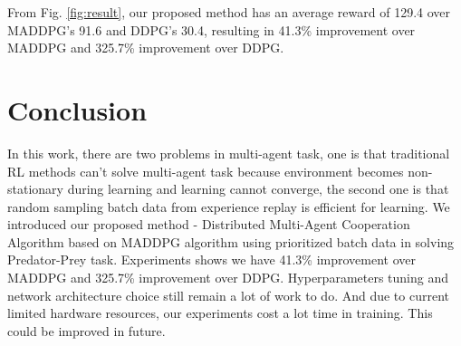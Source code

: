 \documentclass[11pt,twocolumn]{jarticle} %
\begin{document}
From Fig. \ref{fig:result}, our proposed method has an average reward of 129.4 over MADDPG's 91.6 and DDPG's 30.4, resulting in 41.3\% improvement over MADDPG and 325.7\% improvement over DDPG.

\section{Conclusion}
In this work, there are two problems in multi-agent task, one is that traditional RL methods can't solve multi-agent task because environment becomes non-stationary during learning and learning cannot converge, the second one is that random sampling batch data from experience replay is efficient for learning. We introduced our proposed method - Distributed Multi-Agent Cooperation Algorithm based on MADDPG algorithm using prioritized batch data in solving Predator-Prey task. Experiments shows we have 41.3\% improvement over MADDPG and 325.7\% improvement over DDPG.
Hyperparameters tuning and network architecture choice still remain a lot of work to do.
And due to current limited hardware resources, our experiments cost a lot time in training. This could be improved in future.
\end{document}

